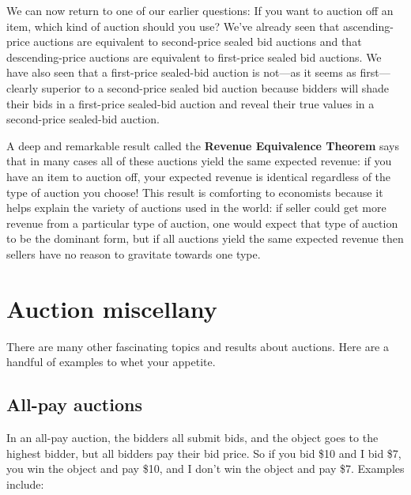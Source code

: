 We can now return to one of our earlier questions: If you want to auction off an item, which kind of auction should you use? We've already seen that ascending-price auctions are equivalent to second-price sealed bid auctions and that descending-price auctions are equivalent to first-price sealed bid auctions. We have also seen that a first-price sealed-bid auction is not---as it seems as first---clearly superior to a second-price sealed bid auction because bidders will shade their bids in a first-price sealed-bid auction and reveal their true values in a second-price sealed-bid auction.

A deep and remarkable result called the \textbf{Revenue Equivalence Theorem} says that in many cases all of these auctions yield the same expected revenue: if you have an item to auction off, your expected revenue is identical regardless of the type of auction you choose! This result is comforting to economists because it helps explain the variety of auctions used in the world: if seller could get more revenue from a particular type of auction, one would expect that type of auction to be the dominant form, but if all auctions yield the same expected revenue then sellers have no reason to gravitate towards one type.





\section{Auction miscellany}

There are many other fascinating topics and results about auctions. Here are a handful of examples to whet your appetite.


\subsection*{All-pay auctions}

In an all-pay auction, the bidders all submit bids, and the object goes to the highest bidder, but all bidders pay their bid price. So if you bid \$10 and I bid \$7, you win the object and pay \$10, and I don't win the object and pay \$7. Examples include:

